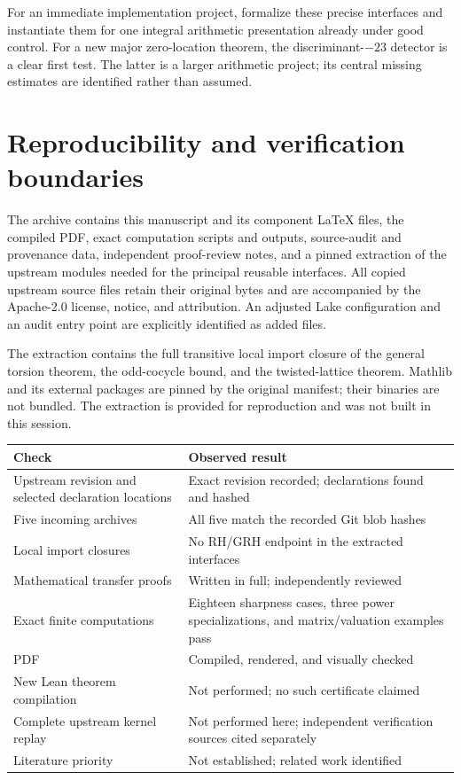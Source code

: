 \documentclass[11pt,letterpaper]{article}
\theoremstyle{remark}
\begin{document}
For an immediate implementation project, formalize these precise
interfaces and instantiate them for one integral arithmetic presentation
already under good control. For a new major zero-location theorem, the
discriminant-$-23$ detector is a clear first test. The latter is a larger
arithmetic project; its central missing estimates are identified rather
than assumed.

\section{Reproducibility and verification boundaries}
\label{sec:reproduce}

The archive contains this manuscript and its component \LaTeX{} files,
the compiled PDF, exact computation scripts and outputs, source-audit and
provenance data, independent proof-review notes, and a pinned extraction
of the upstream modules needed for the principal reusable interfaces.
All copied upstream source files retain their original bytes and are
accompanied by the Apache-2.0 license, notice, and attribution. An adjusted
Lake configuration and an audit entry point are explicitly identified as
added files.

The extraction contains the full transitive local import closure of the
general torsion theorem, the odd-cocycle bound, and the twisted-lattice
theorem. Mathlib and its external packages are pinned by the original
manifest; their binaries are not bundled. The extraction is provided for
reproduction and was not built in this session.

\begin{center}
\small
\begin{tabularx}{\textwidth}{p{}Y}
\toprule
Check & Observed result\\
\midrule
Upstream revision and selected declaration locations & Exact revision
recorded; declarations found and hashed\\
Five incoming archives & All five match the recorded Git blob hashes\\
Local import closures & No RH/GRH endpoint in the extracted interfaces\\
Mathematical transfer proofs & Written in full; independently reviewed\\
Exact finite computations & Eighteen sharpness cases, three power
specializations, and matrix/valuation examples pass\\
PDF & Compiled, rendered, and visually checked\\
New Lean theorem compilation & Not performed; no such certificate claimed\\
Complete upstream kernel replay & Not performed here; independent
verification sources cited separately\\
Literature priority & Not established; related work identified\\
\bottomrule
\end{tabularx}
\end{center}
\end{document}

